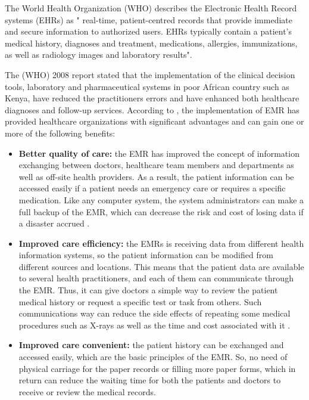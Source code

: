 The World Health Organization (WHO) \cite{WorldHealthOrganization2016} describes the Electronic Health Record systems (EHRs) as  " real-time, patient-centred records that provide immediate and secure information to authorized users. EHRs typically contain a patient’s medical history, diagnoses and treatment, medications, allergies, immunizations, as well as radiology images and laboratory results". 


The \citet{WorldHealthOrganization2013} (WHO) 2008 report stated that the implementation of the clinical decision tools, laboratory and pharmaceutical systems in poor African country such as Kenya, have reduced the practitioners errors and have enhanced both healthcare diagnoses and follow-up services. According to  \cite{OfHealth}, the implementation of EMR has provided healthcare organizations with significant advantages and can gain one or more of the following benefits:
\begin{itemize}
	\item \textbf{Better quality of care:} the EMR has improved the concept of information exchanging between doctors, healthcare team members and departments as well as off-site health providers. As a result, the patient information can be accessed easily if a patient needs an emergency care or requires a specific medication. Like any computer system, the system administrators can make a full backup of the EMR, which can decrease the risk and cost of losing data if a disaster accrued  \cite{OfHealth}.
	\item \textbf{Improved care efficiency:} the EMRs is receiving data from different health information systems, so the patient information can be modified from different sources and locations. This means that the patient data are available to several health practitioners, and each of them can communicate through the EMR. Thus, it can give doctors a simple way to review the patient medical history or request a specific test or task from others. Such communications way can reduce the side effects of repeating some medical procedures such as X-rays as well as the time and cost associated with it \cite{OfHealth}. 
	
	\item \textbf{Improved care convenient:} the patient history can be exchanged and accessed easily, which are the basic principles of the EMR. So, no need of physical carriage for the paper records or filling more paper forms, which in return can reduce the waiting time for both the patients and doctors to receive or review the medical records\cite{OfHealth}.
\end{itemize}


